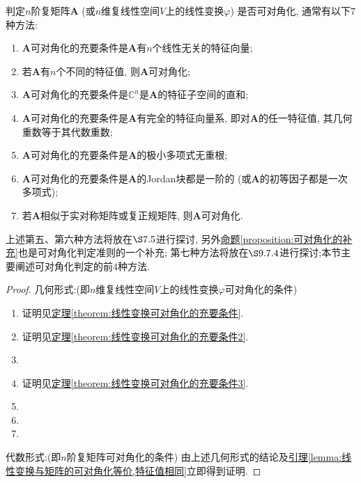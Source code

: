 \documentclass[../../main.tex]{subfiles}
\begin{document}
\begin{theorem}[可对角化的判定条件]\label{theorem:可对角化的判定条件}
判定\(n\)阶复矩阵\(\boldsymbol{A}\) (或\(n\)维复线性空间\(V\)上的线性变换\(\varphi\)) 是否可对角化, 通常有以下\(7\)种方法:
\begin{enumerate}[(1)]
\item  \(\boldsymbol{A}\)可对角化的充要条件是\(\boldsymbol{A}\)有\(n\)个线性无关的特征向量;

\item 若\(\boldsymbol{A}\)有\(n\)个不同的特征值, 则\(\boldsymbol{A}\)可对角化;

\item \(\boldsymbol{A}\)可对角化的充要条件是\(\mathbb{C}^{n}\)是\(\boldsymbol{A}\)的特征子空间的直和;

\item \(\boldsymbol{A}\)可对角化的充要条件是\(\boldsymbol{A}\)有完全的特征向量系, 即对\(\boldsymbol{A}\)的任一特征值, 其几何重数等于其代数重数;

\item \(\boldsymbol{A}\)可对角化的充要条件是\(\boldsymbol{A}\)的极小多项式无重根;

\item \(\boldsymbol{A}\)可对角化的充要条件是\(\boldsymbol{A}\)的Jordan块都是一阶的 (或\(\boldsymbol{A}\)的初等因子都是一次多项式);

\item 若\(\boldsymbol{A}\)相似于实对称矩阵或复正规矩阵, 则\(\boldsymbol{A}\)可对角化.
\end{enumerate}
\end{theorem}
\begin{remark}
上述第五、第六种方法将放在\(\S7.5\)进行探讨, 另外\hyperref[proposition:可对角化的补充]{命题\ref{proposition:可对角化的补充}}也是可对角化判定准则的一个补充; 第七种方法将放在\(\S9.7.4\)进行探讨;本节主要阐述可对角化判定的前\(4\)种方法.
\end{remark}
\begin{proof}
{\heiti 几何形式:}(即\(n\)维复线性空间\(V\)上的线性变换\(\varphi\)可对角化的条件)
\begin{enumerate}[(1)]
\item 证明见\hyperref[theorem:线性变换可对角化的充要条件]{定理\ref{theorem:线性变换可对角化的充要条件}}.

\item 证明见\hyperref[theorem:线性变换可对角化的充要条件2]{定理\ref{theorem:线性变换可对角化的充要条件2}}.

\item 

\item 证明见\hyperref[theorem:线性变换可对角化的充要条件3]{定理\ref{theorem:线性变换可对角化的充要条件3}}.

\item 

\item 

\item 
\end{enumerate}
{\heiti 代数形式:}(即\(n\)阶复矩阵可对角化的条件)
由上述几何形式的结论及\hyperref[lemma:线性变换与矩阵的可对角化等价,特征值相同]{引理\ref{lemma:线性变换与矩阵的可对角化等价,特征值相同}}立即得到证明.
\end{proof}
\end{document}

